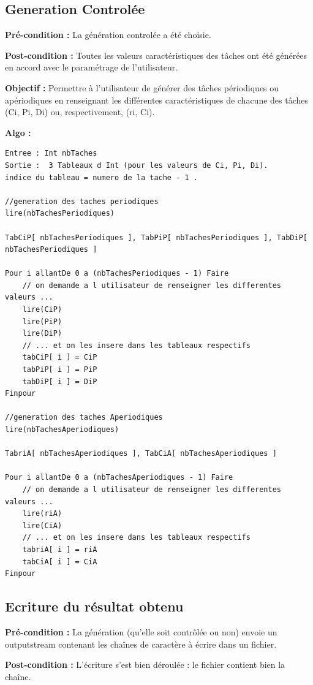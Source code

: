 	\subsection{Generation Controlée}  
		\textbf{Pré-condition :} La génération controlée a été choisie.
		
		\textbf{Post-condition :} Toutes les valeurs caractéristiques des tâches ont été générées en accord avec le paramétrage de l’utilisateur.
		
		\textbf{Objectif :} Permettre à l’utilisateur de générer des tâches périodiques ou apériodiques en renseignant les différentes caractéristiques de chacune des tâches (Ci, Pi, Di) ou, respectivement, (ri, Ci).
		
		\textbf{Algo :} 
			\begin{lstlisting}
Entree : Int nbTaches
Sortie :  3 Tableaux d Int (pour les valeurs de Ci, Pi, Di). 
indice du tableau = numero de la tache - 1 .

//generation des taches periodiques
lire(nbTachesPeriodiques)

TabCiP[ nbTachesPeriodiques ], TabPiP[ nbTachesPeriodiques ], TabDiP[ nbTachesPeriodiques ]
		
Pour i allantDe 0 a (nbTachesPeriodiques - 1) Faire
	// on demande a l utilisateur de renseigner les differentes valeurs ...
	lire(CiP)
	lire(PiP)
	lire(DiP)        
	// ... et on les insere dans les tableaux respectifs
	tabCiP[ i ] = CiP
	tabPiP[ i ] = PiP
	tabDiP[ i ] = DiP
Finpour

//generation des taches Aperiodiques
lire(nbTachesAperiodiques)

TabriA[ nbTachesAperiodiques ], TabCiA[ nbTachesAperiodiques ]
		
Pour i allantDe 0 a (nbTachesAperiodiques - 1) Faire
	// on demande a l utilisateur de renseigner les differentes valeurs ...
	lire(riA)
	lire(CiA)        
	// ... et on les insere dans les tableaux respectifs
	tabriA[ i ] = riA
	tabCiA[ i ] = CiA
Finpour

			\end{lstlisting}

	\subsection{Ecriture du résultat obtenu}
		\textbf{Pré-condition :} La génération (qu'elle soit contrôlée ou non) envoie un outputstream contenant les chaînes de caractère à écrire dans un fichier.
		
		\textbf{Post-condition :} L'écriture s'est bien déroulée : le fichier contient bien la chaîne.
		
